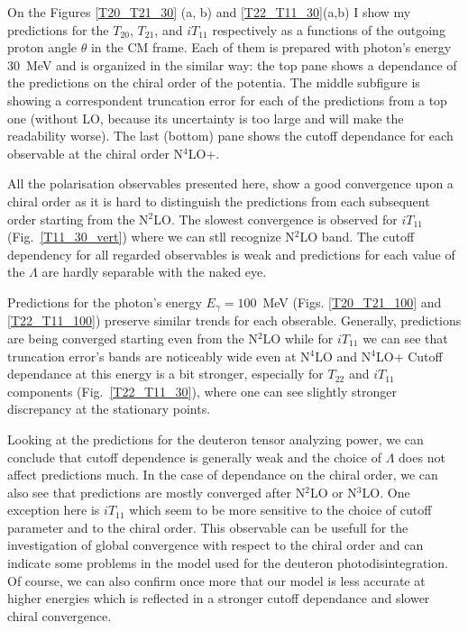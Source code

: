     On the Figures \ref{T20_T21_30} (a, b) and \ref{T22_T11_30}(a,b)
    I show my predictions for the
    $T_{20}$, $T_{21}$,  and $iT_{11}$ respectively as a functions 
    of the outgoing proton angle $\theta$ in the CM frame. Each of them
    is prepared with photon's energy 30~MeV and is
    organized in the similar way: the top
    pane shows a dependance of the predictions on the 
    chiral order of the potentia. The middle subfigure is
    showing a correspondent truncation error for each of the 
    predictions from a top one (without LO, because its uncertainty is
    too large and will make the readability worse). The last (bottom)
    pane shows the cutoff dependance for each observable at the chiral
    order N$^4$LO+. 

    All the polarisation observables presented here, show a good convergence 
    upon a chiral order as it is hard to distinguish the predictions
    from each subsequent order starting from the N$^2$LO. 
    The slowest convergence is observed for $iT_{11}$ (Fig.~\ref{T11_30_vert})
    where we can stll recognize N$^2$LO band.
    The cutoff dependency for all regarded observables is weak and 
    predictions for each value of the $\Lambda$ are hardly separable 
    with the naked eye. 


    Predictions for the photon's energy $E_\gamma = 100$~MeV
    (Figs. \ref{T20_T21_100} and \ref{T22_T11_100}) preserve similar
    trends for each obserable. 
    Generally, predictions are being converged starting
    even from the N$^2$LO while for $iT_{11}$
    we can see 
    that truncation error's bands are noticeably wide
    even at N$^4$LO and N$^4$LO+
    Cutoff dependance at this energy is a bit stronger, especially
    for 
    $T_{22}$ and $iT_{11}$ components (Fig.~\ref{T22_T11_30}),
    where one can see 
    slightly stronger discrepancy at the stationary points.
    
    Looking at the predictions for the deuteron tensor analyzing power,
    we can conclude that cutoff dependence is generally weak
    and the choice of $\Lambda$ does not affect predictions much.
    In the case of dependance on the chiral order, we can
    also see that predictions are mostly converged after N$^2$LO or N$^3$LO.
    One exception here is $iT_{11}$ which seem to be more sensitive
    to the choice of cutoff parameter and to the chiral order.
    This observable can be usefull for the investigation of global 
    convergence with respect to the chiral order and
    can indicate some problems in the model used for the
    deuteron photodisintegration.
    Of course, we can also confirm once more that 
    our model is less accurate at higher energies which is reflected
    in a stronger cutoff dependance and slower chiral convergence.


